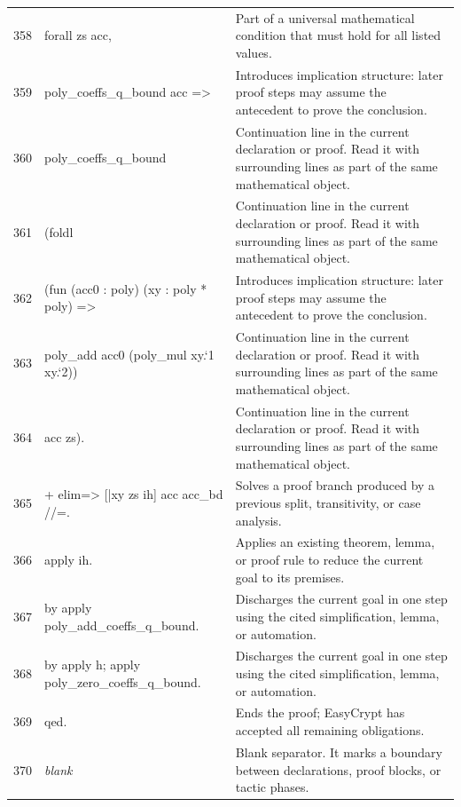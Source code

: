 \documentclass[10pt]{article}
\begin{document}
\begin{longtable}{r L{0.53\textwidth} L{0.37\textwidth}}
358 & {\ttfamily\scriptsize   forall zs acc,} & Part of a universal mathematical condition that must hold for all listed values. \\
359 & {\ttfamily\scriptsize     poly\_coeffs\_q\_bound acc =>} & Introduces implication structure: later proof steps may assume the antecedent to prove the conclusion. \\
360 & {\ttfamily\scriptsize     poly\_coeffs\_q\_bound} & Continuation line in the current declaration or proof.  Read it with surrounding lines as part of the same mathematical object. \\
361 & {\ttfamily\scriptsize       (foldl} & Continuation line in the current declaration or proof.  Read it with surrounding lines as part of the same mathematical object. \\
362 & {\ttfamily\scriptsize         (fun (acc0 : poly) (xy : poly * poly) =>} & Introduces implication structure: later proof steps may assume the antecedent to prove the conclusion. \\
363 & {\ttfamily\scriptsize           poly\_add acc0 (poly\_mul xy.`1 xy.`2))} & Continuation line in the current declaration or proof.  Read it with surrounding lines as part of the same mathematical object. \\
364 & {\ttfamily\scriptsize         acc zs).} & Continuation line in the current declaration or proof.  Read it with surrounding lines as part of the same mathematical object. \\
365 & {\ttfamily\scriptsize + elim=> [|xy zs ih] acc acc\_bd //=.} & Solves a proof branch produced by a previous split, transitivity, or case analysis. \\
366 & {\ttfamily\scriptsize   apply ih.} & Applies an existing theorem, lemma, or proof rule to reduce the current goal to its premises. \\
367 & {\ttfamily\scriptsize   by apply poly\_add\_coeffs\_q\_bound.} & Discharges the current goal in one step using the cited simplification, lemma, or automation. \\
368 & {\ttfamily\scriptsize by apply h; apply poly\_zero\_coeffs\_q\_bound.} & Discharges the current goal in one step using the cited simplification, lemma, or automation. \\
369 & {\ttfamily\scriptsize qed.} & Ends the proof; EasyCrypt has accepted all remaining obligations. \\
370 & {\ttfamily\scriptsize \emph{blank}} & Blank separator.  It marks a boundary between declarations, proof blocks, or tactic phases. \\

\end{longtable}
\end{document}
